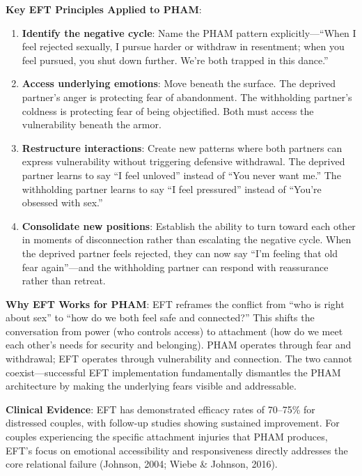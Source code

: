 \documentclass[12pt, letterpaper]{article}
\begin{document}
\textbf{Key EFT Principles Applied to PHAM}:
\begin{enumerate}
    \item \textbf{Identify the negative cycle}: Name the PHAM pattern explicitly---``When I feel rejected sexually, I pursue harder or withdraw in resentment; when you feel pursued, you shut down further. We're both trapped in this dance.''
    
    \item \textbf{Access underlying emotions}: Move beneath the surface. The deprived partner's anger is protecting fear of abandonment. The withholding partner's coldness is protecting fear of being objectified. Both must access the vulnerability beneath the armor.
    
    \item \textbf{Restructure interactions}: Create new patterns where both partners can express vulnerability without triggering defensive withdrawal. The deprived partner learns to say ``I feel unloved'' instead of ``You never want me.'' The withholding partner learns to say ``I feel pressured'' instead of ``You're obsessed with sex.''
    
    \item \textbf{Consolidate new positions}: Establish the ability to turn toward each other in moments of disconnection rather than escalating the negative cycle. When the deprived partner feels rejected, they can now say ``I'm feeling that old fear again''---and the withholding partner can respond with reassurance rather than retreat.
\end{enumerate}

\textbf{Why EFT Works for PHAM}: EFT reframes the conflict from ``who is right about sex'' to ``how do we both feel safe and connected?'' This shifts the conversation from power (who controls access) to attachment (how do we meet each other's needs for security and belonging). PHAM operates through fear and withdrawal; EFT operates through vulnerability and connection. The two cannot coexist---successful EFT implementation fundamentally dismantles the PHAM architecture by making the underlying fears visible and addressable.

\textbf{Clinical Evidence}: EFT has demonstrated efficacy rates of 70--75\% for distressed couples, with follow-up studies showing sustained improvement. For couples experiencing the specific attachment injuries that PHAM produces, EFT's focus on emotional accessibility and responsiveness directly addresses the core relational failure (Johnson, 2004; Wiebe \& Johnson, 2016).
\end{document}
